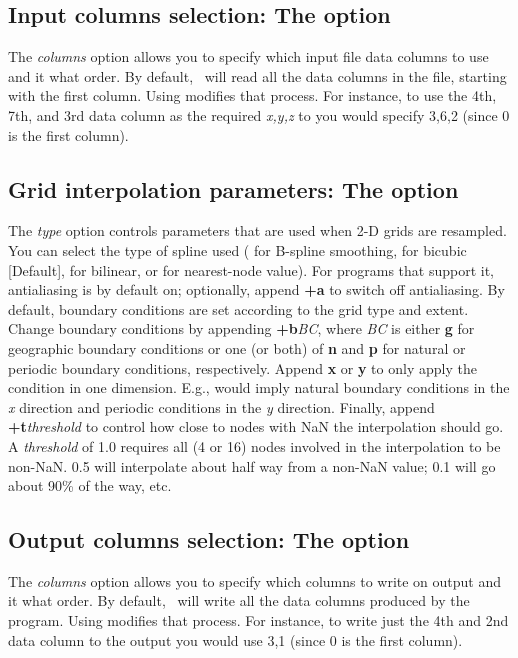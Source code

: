 \subsection{Input columns selection: The  option}
\label{sec:incols}
The \emph{columns} option allows you to specify which
input file data columns to use and it what order.  By default, \GMT\ will
read all the data columns in the file, starting with the first column.
Using  modifies that process.  For instance, to use the 4th, 7th, and
3rd data column as the required {\it x,y,z} to  you would
specify 3,6,2 (since 0 is the first column).

\subsection{Grid interpolation parameters: The  option}
\label{sec:resample}
The \emph{type} option controls parameters that are
used when 2-D grids are resampled.  You can select the type
of spline used ( for B-spline smoothing,  for bicubic [Default],
 for bilinear, or  for nearest-node value).
For programs that support it, antialiasing is by default on;
optionally, append {\bf +a} to switch off antialiasing.
By default, boundary conditions are set according to the grid type and extent.
Change boundary conditions by appending {\bf +b}{\it BC},
where {\it BC} is either {\bf g} for geographic boundary conditions
or one (or both) of  {\bf n} and {\bf p} for natural or periodic boundary
conditions, respectively.  Append {\bf x} or {\bf y} to only apply the condition
in one dimension.  E.g.,  would imply natural boundary conditions in
the {\it x} direction and periodic conditions in the {\it y} direction.
Finally, append {\bf +t}{\it threshold} to control
how close to nodes with NaN the interpolation should go.  A
{\it threshold} of 1.0 requires all (4 or 16) nodes involved in the
interpolation to be non-NaN. 0.5 will interpolate about half way from a
non-NaN value; 0.1 will go about 90\% of the way, etc.

\subsection{Output columns selection: The  option}
\label{sec:outcols}
The \emph{columns} option allows you to specify which
columns to write on output and it what order.  By default, \GMT\ will
write all the data columns produced by the program.
Using  modifies that process.  For instance, to write just the 4th and
2nd data column to the output you would use 3,1 (since 0 is the first column).

